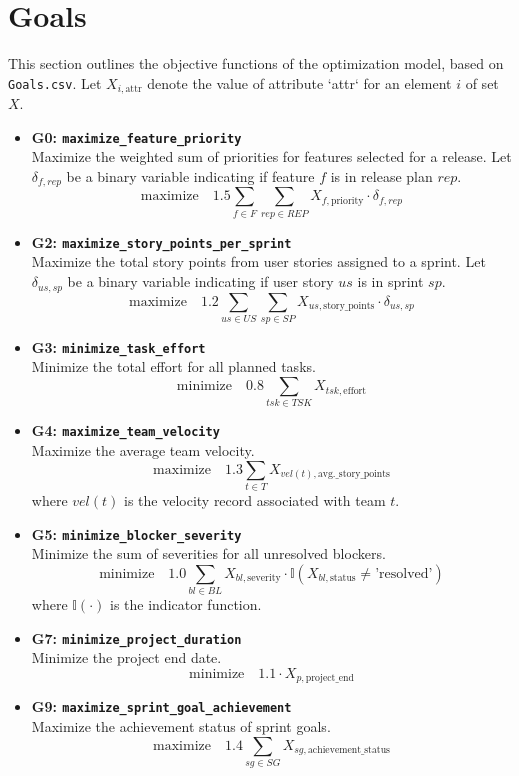 \documentclass[11pt, a4paper]{article}
\begin{document}
\section{Goals}
This section outlines the objective functions of the optimization model, based on \texttt{Goals.csv}. Let $X_{i, \text{attr}}$ denote the value of attribute `attr` for an element $i$ of set $X$.

\begin{itemize}
    \item \textbf{G0: \texttt{maximize\_feature\_priority}}
    \\ Maximize the weighted sum of priorities for features selected for a release. Let $\delta_{f,rep}$ be a binary variable indicating if feature $f$ is in release plan $rep$.
    $$ \text{maximize} \quad 1.5 \sum_{f \in F} \sum_{rep \in REP} X_{f, \text{priority}} \cdot \delta_{f,rep} $$
    
    \item \textbf{G2: \texttt{maximize\_story\_points\_per\_sprint}}
    \\ Maximize the total story points from user stories assigned to a sprint. Let $\delta_{us,sp}$ be a binary variable indicating if user story $us$ is in sprint $sp$.
    $$ \text{maximize} \quad 1.2 \sum_{us \in US} \sum_{sp \in SP} X_{us, \text{story\_points}} \cdot \delta_{us,sp} $$

    \item \textbf{G3: \texttt{minimize\_task\_effort}}
    \\ Minimize the total effort for all planned tasks.
    $$ \text{minimize} \quad 0.8 \sum_{tsk \in TSK} X_{tsk, \text{effort}} $$

    \item \textbf{G4: \texttt{maximize\_team\_velocity}}
    \\ Maximize the average team velocity.
    $$ \text{maximize} \quad 1.3 \sum_{t \in T} X_{vel(t), \text{avg.\_story\_points}} $$
    where $vel(t)$ is the velocity record associated with team $t$.

    \item \textbf{G5: \texttt{minimize\_blocker\_severity}}
    \\ Minimize the sum of severities for all unresolved blockers.
    $$ \text{minimize} \quad 1.0 \sum_{bl \in BL} X_{bl, \text{severity}} \cdot \mathbb{I}(X_{bl, \text{status}} \neq \text{'resolved'}) $$
    where $\mathbb{I}(\cdot)$ is the indicator function.

    \item \textbf{G7: \texttt{minimize\_project\_duration}}
    \\ Minimize the project end date.
    $$ \text{minimize} \quad 1.1 \cdot X_{p, \text{project\_end}} $$
    
    \item \textbf{G9: \texttt{maximize\_sprint\_goal\_achievement}}
    \\ Maximize the achievement status of sprint goals.
    $$ \text{maximize} \quad 1.4 \sum_{sg \in SG} X_{sg, \text{achievement\_status}} $$
\end{itemize}
\end{document}
